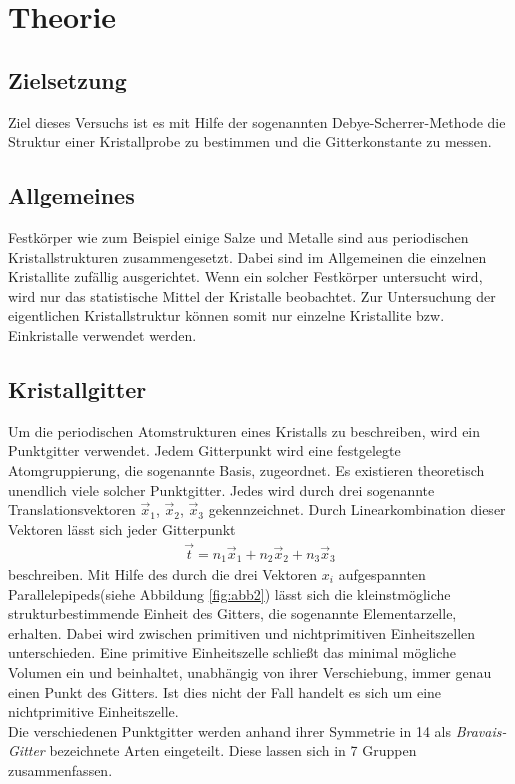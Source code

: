 \section{Theorie}
\label{sec:Theorie}

\subsection{Zielsetzung}
\label{subsec:Zielsetzung}
Ziel dieses Versuchs ist es mit Hilfe der sogenannten
Debye-Scherrer-Methode die Struktur einer Kristallprobe
zu bestimmen und die Gitterkonstante zu messen.

\subsection{Allgemeines}
\label{subsec:allgemein}

Festkörper wie zum Beispiel einige Salze und Metalle
sind aus periodischen
Kristallstrukturen zusammengesetzt. Dabei sind im
Allgemeinen die einzelnen Kristallite zufällig
ausgerichtet. Wenn ein solcher Festkörper untersucht wird,
wird nur das statistische Mittel der Kristalle beobachtet.
Zur Untersuchung der eigentlichen Kristallstruktur
können somit nur einzelne Kristallite bzw.
Einkristalle verwendet werden.

\subsection{Kristallgitter}
\label{subsec:kristallstrukturen}
Um die periodischen Atomstrukturen eines Kristalls
zu beschreiben, wird ein Punktgitter verwendet.
Jedem Gitterpunkt wird eine festgelegte Atomgruppierung,
die sogenannte Basis, zugeordnet.
Es existieren theoretisch unendlich viele solcher Punktgitter.
Jedes wird durch drei sogenannte Translationsvektoren
$\vec{x}_{1}$, $\vec{x}_{2}$, $\vec{x}_{3}$ gekennzeichnet.
Durch Linearkombination dieser Vektoren lässt sich
jeder Gitterpunkt
\begin{align}
\label{eqn:1*}
\vec{t} = n_{1} \vec{x}_{1} + n_{2} \vec{x}_{2} + n_{3} \vec{x}_{3}
\end{align}
beschreiben.
Mit Hilfe des durch die drei Vektoren $x_{i}$ aufgespannten
Parallelepipeds(siehe Abbildung \ref{fig:abb2}) lässt sich die
kleinstmögliche strukturbestimmende Einheit des Gitters,
die sogenannte Elementarzelle, erhalten.
Dabei wird zwischen primitiven und nichtprimitiven Einheitszellen
unterschieden. Eine primitive Einheitszelle schließt das minimal mögliche Volumen ein
und beinhaltet, unabhängig von ihrer Verschiebung, immer genau einen Punkt des
Gitters. Ist dies nicht der Fall handelt es sich um eine nichtprimitive Einheitszelle.\\
Die verschiedenen Punktgitter werden anhand ihrer Symmetrie
in 14 als \textit{Bravais-Gitter} bezeichnete Arten eingeteilt.
Diese lassen sich in 7 Gruppen zusammenfassen.

